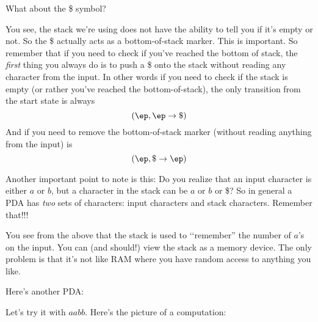 What about the \$ symbol?

You see, the stack we're using does not have the ability to tell you if it's
empty or not.
So the \$ actually acts as a bottom-of-stack marker.
This is important.
So remember that if you need to check if you've reached the bottom of stack,
the \textit{ first} thing you always do is to push a \$ onto the stack without
reading any character from the input.
In other words if you need to check if the stack is empty (or rather
you've reached the bottom-of-stack), the only transition from the start
state is always
\[
(\ep, \ep \rightarrow \$)
\]
And if you need to remove the bottom-of-stack marker (without reading anything
from the input) is
\[
(\ep, \$ \rightarrow \ep)
\]

Another important point to note is this:
Do you realize that an input character is either $a$ or $b$, but a character
in the stack can be $a$ or $b$ or \$?
So in general a PDA has \textit{ two} sets of characters:
input characters and stack characters.
Remember that!!!

You see from the above
that the stack is used to \lq\lq remember'' the number of $a$'s on
the input.
You can (and should!) view the stack as a memory device.
The only problem is that it's not like RAM where you have random access to
anything you like.




\newpage
Here's another PDA:
\begin{center}
\end{center}

Let's try it with $aabb$.
Here's the picture of a computation:

